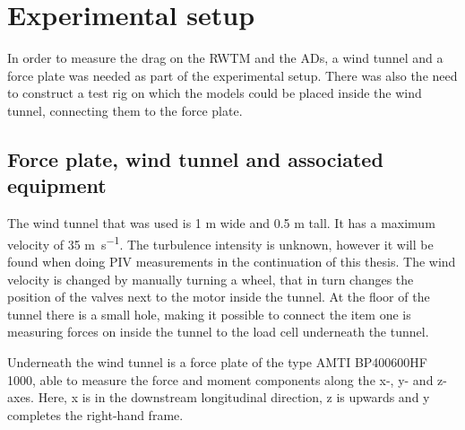 \section{Experimental setup}

In order to measure the drag on the \gls{RWTM} and the \gls{AD}s, a wind tunnel and a force plate was needed as part of the experimental setup. There was also the need to construct a test rig on which the models could be placed inside the wind tunnel, connecting them to the force plate. 

\subsection{Force plate, wind tunnel and associated equipment}
The wind tunnel that was used is 1 \si{\metre} wide and 0.5 \si{\m} tall. It has a maximum velocity of 35 \si{\m\per\s}. The turbulence intensity is unknown, however it will be found when doing \gls{PIV} measurements in the continuation of this thesis. The wind velocity is changed by manually turning a wheel, that in turn changes the position of the valves next to the motor inside the tunnel. At the floor of the tunnel there is a small hole, making it possible to connect the item one is measuring forces on inside the tunnel to the load cell underneath the tunnel.  


Underneath the wind tunnel is a force plate of the type AMTI BP400600HF 1000, able to measure the force and moment components along the x-, y- and z-axes. Here, x is in the downstream longitudinal direction, z is upwards and y completes the right-hand frame. %


